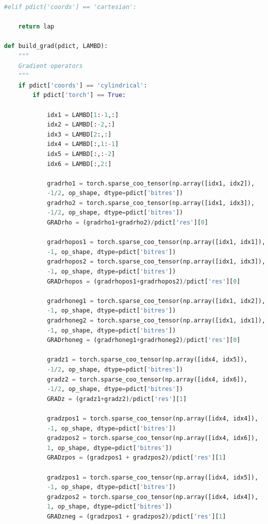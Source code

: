 \begin{spacing}{1.2}
\begin{lstlisting}[frame=single, language=Python]
    #elif pdict['coords'] == 'cartesian':
        
    return lap

def build_grad(pdict, LAMBD):
    """
    Gradient operators 
    """
    if pdict['coords'] == 'cylindrical': 
        if pdict['torch'] == True:
            
            idx1 = LAMBD[1:-1,:]
            idx2 = LAMBD[:-2,:]
            idx3 = LAMBD[2:,:]
            idx4 = LAMBD[:,1:-1]
            idx5 = LAMBD[:,:-2]
            idx6 = LAMBD[:,2:]
            
            gradrho1 = torch.sparse_coo_tensor(np.array([idx1, idx2]), 
			-1/2, op_shape, dtype=pdict['bitres'])
            gradrho2 = torch.sparse_coo_tensor(np.array([idx1, idx3]), 
			-1/2, op_shape, dtype=pdict['bitres'])
            GRADrho = (gradrho1+gradrho2)/pdict['res'][0]
            
            gradrhopos1 = torch.sparse_coo_tensor(np.array([idx1, idx1]), 
			-1, op_shape, dtype=pdict['bitres'])
            gradrhopos2 = torch.sparse_coo_tensor(np.array([idx1, idx3]), 
			-1, op_shape, dtype=pdict['bitres'])
            GRADrhopos = (gradrhopos1+gradrhopos2)/pdict['res'][0]
            
            gradrhoneg1 = torch.sparse_coo_tensor(np.array([idx1, idx2]), 
			-1, op_shape, dtype=pdict['bitres'])
            gradrhoneg2 = torch.sparse_coo_tensor(np.array([idx1, idx1]), 
			-1, op_shape, dtype=pdict['bitres'])
            GRADrhoneg = (gradrhoneg1+gradrhoneg2)/pdict['res'][0]
            
            gradz1 = torch.sparse_coo_tensor(np.array([idx4, idx5]), 
			-1/2, op_shape, dtype=pdict['bitres'])
            gradz2 = torch.sparse_coo_tensor(np.array([idx4, idx6]), 
			-1/2, op_shape, dtype=pdict['bitres'])
            GRADz = (gradz1+gradz2)/pdict['res'][1]
            
            gradzpos1 = torch.sparse_coo_tensor(np.array([idx4, idx4]), 
			-1, op_shape, dtype=pdict['bitres'])
            gradzpos2 = torch.sparse_coo_tensor(np.array([idx4, idx6]), 
			1, op_shape, dtype=pdict['bitres'])
            GRADzpos = (gradzpos1 + gradzpos2)/pdict['res'][1]
            
            gradzpos1 = torch.sparse_coo_tensor(np.array([idx4, idx5]), 
			-1, op_shape, dtype=pdict['bitres'])
            gradzpos2 = torch.sparse_coo_tensor(np.array([idx4, idx4]), 
			1, op_shape, dtype=pdict['bitres'])
            GRADzneg = (gradzpos1 + gradzpos2)/pdict['res'][1]
            

\end{lstlisting}
\end{spacing}
